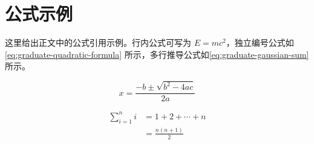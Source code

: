 \section{公式示例}
这里给出正文中的公式引用示例。行内公式可写为 $E=mc^2$，独立编号公式如\autoref{eq:graduate-quadratic-formula} 所示，多行推导公式如\autoref{eq:graduate-gaussian-sum} 所示。

\begin{equation}
    x = \frac{-b \pm \sqrt{b^2 - 4ac}}{2a}
    \label{eq:graduate-quadratic-formula}
\end{equation}

\begin{equation}
    \begin{aligned}
        \sum_{i=1}^{n} i &= 1 + 2 + \cdots + n \\
                         &= \frac{n(n+1)}{2}
    \end{aligned}
    \label{eq:graduate-gaussian-sum}
\end{equation}
